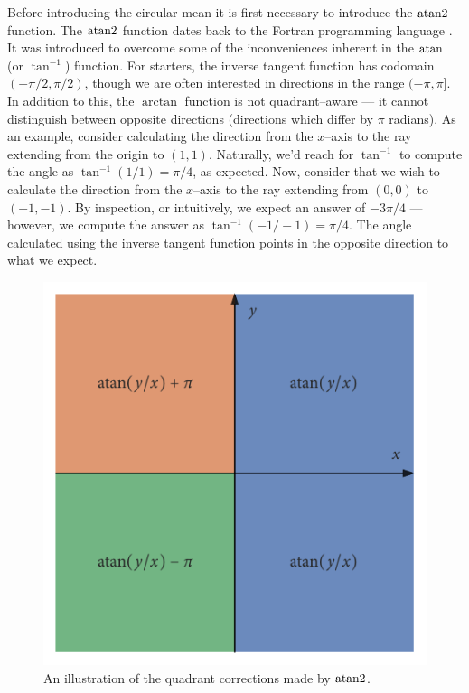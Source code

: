Before introducing the circular mean it is first necessary to introduce the $\operatorname{atan2}$ function. The $\operatorname{atan2}$ function dates back to the Fortran programming language \citep{organick66}. It was introduced to overcome some of the inconveniences inherent in the $\atan$ (or $\tan^{-1}$) function. For starters, the inverse tangent function has codomain $(-\pi/2, \pi/2)$, though we are often interested in directions in the range $(-\pi, \pi]$. In addition to this, the $\arctan$ function is not quadrant--aware --- it cannot distinguish between opposite directions (directions which differ by $\pi$ radians). As an example, consider calculating the direction from the $x$--axis to the ray extending from the origin to $(1, 1)$. Naturally, we'd reach for $\tan^{-1}$ to compute the angle as $\tan^{-1}(1/1) = \pi/4$, as expected. Now, consider that we wish to calculate the direction from the $x$--axis to the ray extending from $(0, 0)$ to $(-1, -1)$. By inspection, or intuitively, we expect an answer of $-3\pi/4$ --- however, we compute the answer as $\tan^{-1}(-1/-1) = \pi/4$. The angle calculated using the inverse tangent function points in the opposite direction to what we expect.

\begin{figure}
	\includegraphics{atan_quadrants.pdf}
	\caption{An illustration of the quadrant corrections made by $\operatorname{atan2}$.}
	\label{fig:atan_quadrants}
\end{figure}

